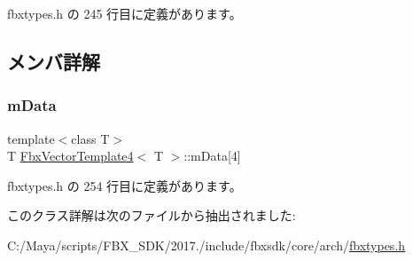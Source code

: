  fbxtypes.\+h の 245 行目に定義があります。



\subsection{メンバ詳解}
\mbox{\label{class_fbx_vector_template4_a8876bb35672f5ce31c297654122dace5}} 
\subsubsection{\texorpdfstring{m\+Data}{mData}}
{\footnotesize\ttfamily template$<$class T$>$ \\
T \hyperlink{class_fbx_vector_template4}{Fbx\+Vector\+Template4}$<$ T $>$\+::m\+Data\mbox{[}4\mbox{]}}



 fbxtypes.\+h の 254 行目に定義があります。



このクラス詳解は次のファイルから抽出されました\+:\begin{DoxyCompactItemize}
\item 
C\+:/\+Maya/scripts/\+F\+B\+X\+\_\+\+S\+D\+K/2017./include/fbxsdk/core/arch/\hyperlink{fbxtypes_8h}{fbxtypes.\+h}\end{DoxyCompactItemize}
